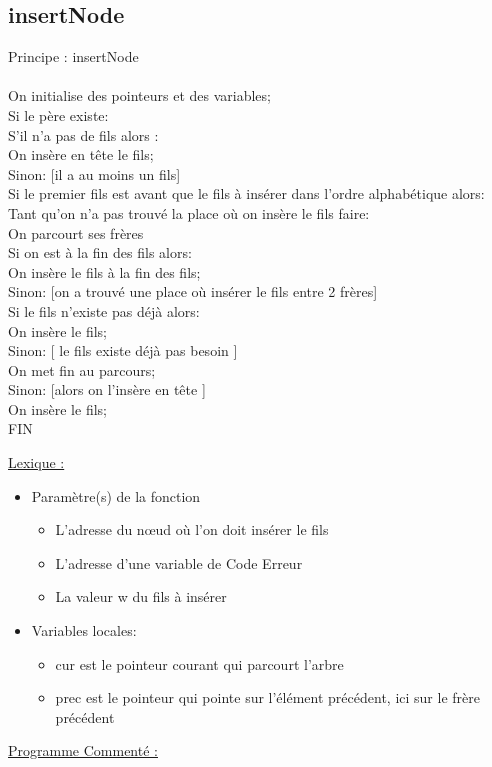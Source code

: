 \documentclass[a4paper]{article}
\newcommand\tab[1][1cm]{\hspace*{#1}}
\begin{document}
\subsection{insertNode}
\begin{algorithm}
Principe : insertNode 
\\
\\
\tab On initialise des pointeurs et des variables;
\\
\tab Si le père existe:
\\
\tab \tab S'il n'a pas de fils alors :
\\
\tab \tab \tab On insère en tête le fils;
\\
\tab \tab Sinon: [il a au moins un fils]
\\
\tab \tab \tab Si le premier fils est avant que le fils à insérer dans l'ordre alphabétique alors:
\\
\tab \tab \tab \tab Tant qu'on n'a pas trouvé la place où on insère le fils faire: 
\\
\tab \tab \tab \tab \tab On parcourt ses frères
\\
\tab \tab \tab \tab Si on est à la fin des fils alors:
\\
\tab \tab \tab \tab \tab On insère le fils à la fin des fils;
\\
\tab \tab \tab \tab Sinon: [on a trouvé une place où insérer le fils entre 2 frères]
\\
\tab \tab \tab \tab \tab Si le fils n'existe pas déjà alors:
\\
\tab \tab \tab \tab \tab \tab On insère le fils;
\\
\tab \tab \tab \tab \tab Sinon: [ le fils existe déjà pas besoin ]
\\ 
\tab \tab \tab \tab \tab \tab On met fin au parcours;
\\ 
\tab \tab \tab Sinon: [alors on l'insère en tête ]
\\
\tab \tab \tab \tab On insère le fils;
\\
FIN
\end{algorithm}
\underline{Lexique :}
\begin{itemize}
\item Paramètre(s) de la fonction  
\begin{itemize}
\item L'adresse du nœud où l'on doit insérer le fils
\item L'adresse d'une variable de Code Erreur
\item La valeur w du fils à insérer
\end{itemize}
\item Variables locales:
\begin{itemize}
\item cur est le pointeur courant qui parcourt l'arbre
\item prec est le pointeur qui pointe sur l'élément précédent, ici sur le frère précédent
\end{itemize}
\end{itemize}
\underline{Programme Commenté :}
\end{document}
